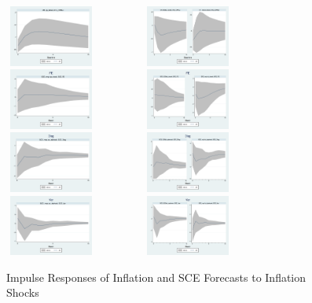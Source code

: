 \documentclass[]{article}
\begin{document}
\begin{figure}[h]\label{SCE_IR}
	\centering
	\includegraphics[width=3cm,height=2cm]{figures/CPIAU_ashocks_nmpM.png}  
	\includegraphics[width=6cm,height=2cm]{figures/CPIAU_ashocksM.png} \\
	\smallskip
	\includegraphics[width=3cm,height=2cm]{figures/SCEFE_ashocks_nmpM.png} 
	\includegraphics[width=6cm,height=2cm]{figures/SCEFE_ashocksM.png} \\
	\smallskip
	\includegraphics[width=3cm,height=2cm]{figures/SCEDisg_ab_ashocks_nmpM.png} 
	\includegraphics[width=6cm,height=2cm]{figures/SCEDisg_ab_ashocksM.png} \\
	\smallskip 
	\includegraphics[width=3cm,height=2cm]{figures/SCEVar_ab_ashocks_nmpM.png} 
	\includegraphics[width=6cm,height=2cm]{figures/SCEVar_ab_ashocksM.png} 
	\caption{ Impulse Responses of Inflation and SCE Forecasts to Inflation Shocks}
\end{figure}
\end{document}
